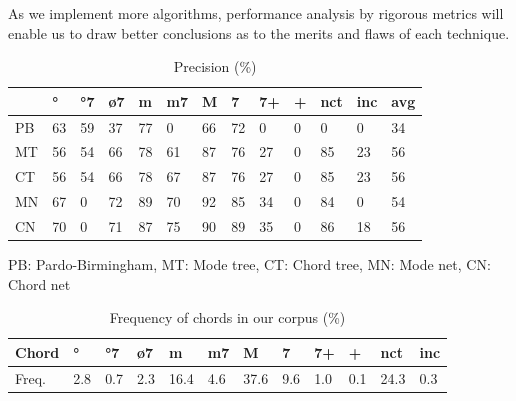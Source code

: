 \documentclass{article}
\begin{document}
As we implement more algorithms, performance analysis by rigorous
metrics will enable us to draw better conclusions as to the merits and
flaws of each technique.


\begin{table}
  \centering
  \begin{tabular}{l|p{.1cm}p{.1cm}p{.1cm}p{.1cm}p{.1cm}p{.1cm}p{.1cm}p{.1cm}p{.01cm}p{.1cm}p{.35cm}|p{.3cm}}
                 &  °& °7& ø7& m&  m7&  M&  7& 7+&+&nct&inc& avg\\
    \hline                                                     
    PB   & 63& 59& 37& 77&  0& 66& 72&  0&0&  0&  0& 34 \\
    MT   & 56& 54& 66& 78& 61& 87& 76& 27&0& 85& 23& 56 \\
    CT   & 56& 54& 66& 78& 67& 87& 76& 27&0& 85& 23& 56 \\
    MN   & 67&  0& 72& 89& 70& 92& 85& 34&0& 84&  0& 54 \\
    CN   & 70&  0& 71& 87& 75& 90& 89& 35&0& 86& 18& 56 \\

  \end{tabular}

\medskip

PB: Pardo-Birmingham, MT: Mode tree, CT: Chord tree, MN: Mode net,
CN: Chord net

  \caption{Precision (\%)}
  \label{tab:precision}
\end{table}

\begin{table}
  \centering
  \begin{tabular}{l|p{.12cm}p{.12cm}p{.12cm}p{.3cm}p{.12cm}p{.3cm}p{.12cm}p{.12cm}p{.12cm}p{.3cm}p{.25cm}}
    Chord        &  °& °7& ø7&   m& m7&   M&  7& 7+&+  & nct&inc \\
    \hline                                                     
    Freq.    &2.8&0.7&2.3&16.4&4.6&37.6&9.6&1.0&0.1&24.3&0.3  \\
  \end{tabular}
  \caption{Frequency of chords in our corpus (\%)}
  \label{tab:frequency}
\end{table}
\end{document}
